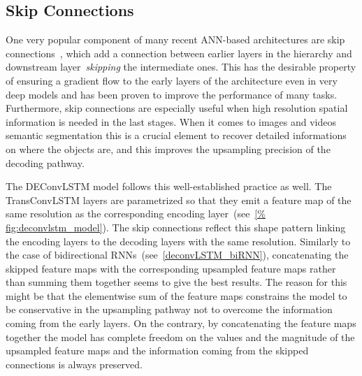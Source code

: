 \subsection{Skip Connections}\label{sec:deconvLSTM_skip_connections}
One very popular component of many recent ANN-based architectures are skip
connections~\citep[see e.g.,~][]{sermanet-cvpr-13,liu2015parsenet,
long2015fully,Srivastava-et-al-arxiv2015,bell2015inside,he2015deep,
hariharan2015hypercolumns}, which add a connection between earlier layers in
the hierarchy and downstream layer~\emph{skipping} the intermediate ones. This
has the desirable property of ensuring a gradient flow to the early layers of
the architecture even in very deep models and has been proven to improve the
performance of many tasks. Furthermore, skip connections are especially useful
when high resolution spatial information is needed in the last stages. When it
comes to images and videos semantic segmentation this is a crucial element to
recover detailed informations on where the objects are, and this improves the
upsampling precision of the decoding pathway.

The DEConvLSTM model follows this well-established practice as well. The
TransConvLSTM layers are parametrized so that they emit a feature map of the
same resolution as the corresponding encoding layer~(see~\autoref{%
fig:deconvlstm_model}). The skip connections reflect this shape pattern linking
the encoding layers to the decoding layers with the same resolution. Similarly
to the case of bidirectional RNNs~(see~\autoref{deconvLSTM_biRNN}),
concatenating the skipped feature maps with the corresponding upsampled feature
maps rather than summing them together seems to give the best results. The
reason for this might be that the elementwise sum of the feature maps
constrains the model to be conservative in the upsampling pathway not to
overcome the information coming from the early layers. On the contrary, by
concatenating the feature maps together the model has complete freedom on the
values and the magnitude of the upsampled feature maps and the information
coming from the skipped connections is always preserved.


